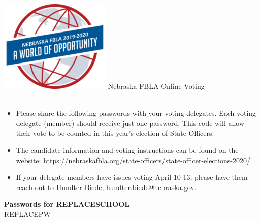 \documentclass{article}
\begin{document}
\includegraphics[scale=0.5]{pdfs/logo.png}
{\Huge Nebraska FBLA Online Voting} \\ \\


{
    \begin{itemize}
    \large
    \item Please share the following passwords with your voting delegates. Each voting delegate (member) should receive just
    one password. This code will allow their vote to be counted in this year’s election of State Officers. \\

    \item The candidate information and voting instructions can be found on the website:
    \url{https://nebraskafbla.org/state-officers/state-officer-elections-2020/} \\

    \item If your delegate members have issues voting April 10-13, please have them reach out to Hundter Biede,
    \href{mailto://hundter.biede@nebraska.gov}{hundter.biede@nebraska.gov}. \\

    \end{itemize}
}

\large
\centering
\textbf{Passwords for REPLACESCHOOL} \\
REPLACEPW
\centering
\end{document}
